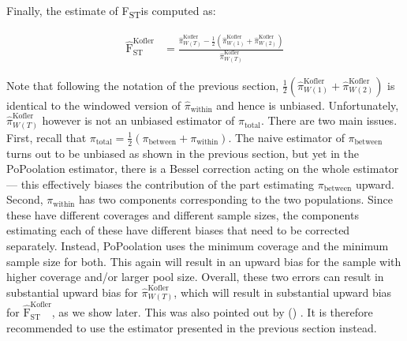 \documentclass[a4paper,fontsize=9pt,DIV=14]{scrartcl}
\newcommand\citeay[1]{\citeauthor{#1} (\citeyear{#1}) \cite{#1}}
\newcommand{\fst}{F\textsubscript{ST}}
\begin{document}
Finally, the estimate of \fst is computed as:

\begin{align}
    \label{eq:PoPoolation2FstEst}
    \widehat{\text{F}}_\text{ST}^\text{Kofler} &= \frac{ \widehat{\pi}_{W(T)}^\text{Kofler} - \frac{1}{2} \left(     \widehat{\pi}_{W(1)}^\text{Kofler} +     \widehat{\pi}_{W(2)}^\text{Kofler}  \right)}{ \widehat{\pi}_{W(T)}^\text{Kofler}}
\end{align}

Note that following the notation of the previous section, $\frac{1}{2}\left(\widehat{\pi}_{W(1)}^\text{Kofler} + \widehat{\pi}_{W(2)}^\text{Kofler}\right)$ is identical to the windowed version of $\widehat{\pi}_\text{within}$ and hence is unbiased.  Unfortunately, $\widehat{\pi}_{W(T)}^\text{Kofler}$ however is not an unbiased estimator of $\pi_\text{total}$.  There are two main issues.  First, recall that $\pi_\text{total} = \frac{1}{2}\left(\pi_\text{between}  + \pi_\text{within} \right)$.  The naive estimator of $\pi_\text{between}$ turns out to be unbiased as shown in the previous section, but yet in the PoPoolation estimator, there is a Bessel correction acting on the whole estimator --- this effectively biases the contribution of the part estimating $\pi_\text{between}$ upward.  Second, $\pi_\text{within}$ has two components corresponding to the two populations.  Since these have different coverages and different sample sizes, the components estimating each of these have different biases that need to be corrected separately.  Instead, PoPoolation uses the minimum coverage and the minimum sample size for both.  This again will result in an upward bias for the sample with higher coverage and/or larger pool size.  Overall, these two errors can result in substantial upward bias for $\widehat{\pi}_{W(T)}^\text{Kofler}$, which will result in substantial upward bias for $\widehat{\text{F}}_\text{ST}^\text{Kofler}$, as we show later.  This was also pointed out by \citeay{Hivert2018}. It is therefore recommended to use the estimator presented in the previous section instead.


\end{document}
